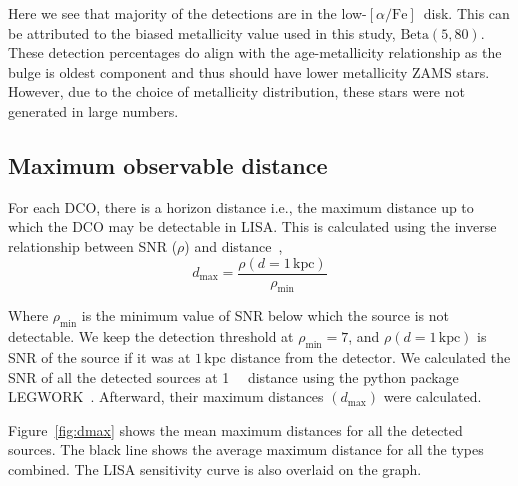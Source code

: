\documentclass[twocolumn, twocolappendix]{aastex63}
\newcommand{\kpc}{\kilo\parsec}
\newcommand{\lowalpha}{low-$[\alpha/\text{Fe}]$}
\begin{document}
    Here we see that majority of the detections are in the \lowalpha\ disk.
    This can be attributed to the biased metallicity value used in this study, $\text{Beta}(5, 80)$.
    These detection percentages do align with the age-metallicity relationship as the bulge is oldest component and thus should have lower metallicity ZAMS stars.
    However, due to the choice of metallicity distribution, these stars were not generated in large numbers.

    \subsection{Maximum observable distance}
    \label{subsec:maximum-observable-distance}
    For each DCO, there is a horizon distance i.e., the maximum distance up to which the DCO may be detectable in LISA\@.
    This is calculated using the inverse relationship between SNR ($\rho$) and distance~\citep{Lau2020},
    \begin{equation}
        \label{eq:eq1}
        d_\text{max}=\frac{\rho(d=1\,\text{kpc})}{\rho_\text{min}}
    \end{equation}

    Where $\rho_{\min}$ is the minimum value of SNR below which the source is not detectable.
    We keep the detection threshold at $\rho_{\min}=7$, and $\rho(d=1\,\text{kpc})$ is SNR of the source if it was at $1\,\text{kpc}$ distance from the detector.
    We calculated the SNR of all the detected sources at \SI{1}{\kpc} distance using the python package LEGWORK~\citep{Wagg2021LW}.
    Afterward, their maximum distances $(d_{\max})$ were calculated.

    Figure~\ref{fig:dmax} shows the mean maximum distances for all the detected sources.
    The black line shows the average maximum distance for all the types combined.
    The LISA sensitivity curve is also overlaid on the graph.
\end{document}
